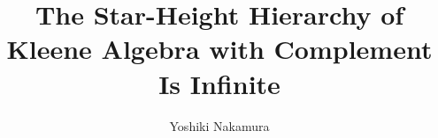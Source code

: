 \documentclass[a4paper,USenglish,cleveref,autoref,thm-restate]{lipics-v2021}
\title{The Star-Height Hierarchy of Kleene Algebra with Complement Is Infinite}
\author{Yoshiki Nakamura}{Chiba University, Japan}{nakamura.yoshiki.ny@gmail.com}{https://orcid.org/0000-0003-4106-0408}{}
\begin{document}
\maketitle

\begin{abstract}

\end{abstract}










\appendix




\end{document}
